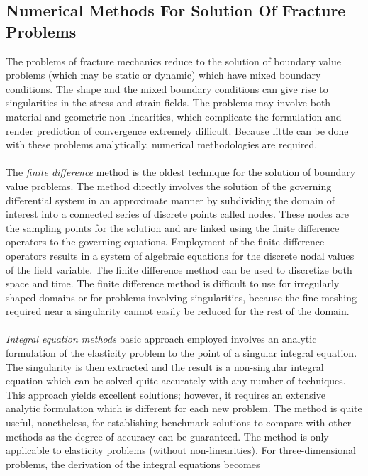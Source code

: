 \documentclass[12pt]{article}
\begin{document}
\subsection{Numerical Methods For Solution Of Fracture Problems}
The problems of fracture mechanics reduce to the solution of boundary value problems (which may
be static or dynamic) which have mixed boundary conditions. The shape and the mixed boundary
conditions can give rise to singularities in the stress and strain fields. The problems may involve
both material and geometric non-linearities, which complicate the formulation and render
prediction of convergence extremely difficult. Because little can be done with these problems
analytically, numerical methodologies are required.
\\\\
The \textit{finite difference} method is the oldest technique for the solution of boundary value
problems. The method directly involves the solution of the
governing differential system in an approximate manner by subdividing the domain of interest into
a connected series of discrete points called nodes. These nodes are the sampling points for the
solution and are linked using the finite difference operators to the governing equations. Employment 
of the finite difference operators results in a system of algebraic equations for the discrete
nodal values of the field variable. The finite difference method can be used to discretize both space
and time. The finite difference method is difficult to use for irregularly shaped domains or for problems involving
singularities, because the fine meshing required near a singularity cannot easily be reduced for the
rest of the domain. 
\\\\
\textit{Integral equation methods} basic approach employed involves an analytic formulation
of the elasticity problem to the point of a singular integral equation. The singularity is then
extracted and the result is a non-singular integral equation which can be solved quite accurately
with any number of techniques. This approach yields excellent solutions; however, it requires an
extensive analytic formulation which is different for each new problem. The method is quite useful,
nonetheless, for establishing benchmark solutions to compare with other methods as the degree
of accuracy can be guaranteed. The method is only applicable to elasticity problems (without
non-linearities). For three-dimensional problems, the derivation of the integral equations becomes
\end{document}
